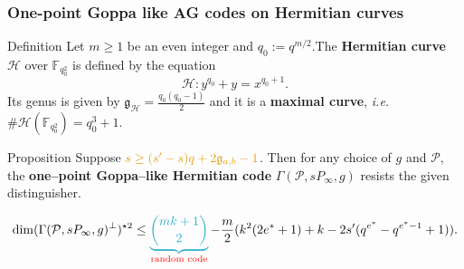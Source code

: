 \documentclass[
10pt, %
%
aspectratio=169, %
]{beamer}
\theoremstyle{plain}%
\theoremstyle{definition}
\theoremstyle{remark}
\newcommand{\calP}{\mathcal{P}}
\newcommand{\calH}{\mathcal{H}}
\newcommand{\fqo}{\mathbb{F}_{q_0^2}}
\begin{document}
\begin{frame}
	\frametitle{One-point Goppa like AG codes on Hermitian curves}
	\begin{block}{Definition }
		Let $m \geq 1$ be an even integer and $q_0 := q^{m/2}$.The \textbf{Hermitian curve} $\calH$ over $\fqo$ is defined by the equation
		\[\calH : y^{q_0}+y = x^{q_0+1}.\]
		Its genus is given by $\mathfrak{g}_{\calH} = \frac{q_0(q_0-1)}{2}$ and it is a \textbf{maximal curve}, \emph{i.e.} $\#\calH(\fqo) = q_0^3+1$.
	\end{block}
	
	\begin{block}{Proposition \cite{lhotel2023goppa}} 
		Suppose $\mathcolor{gamboge}{s \geq (s'-s)q+2\mathfrak{g}_{a,b}-1}$. Then for any choice of $g$ and $\calP$, the \textbf{one--point Goppa--like Hermitian code} $\Gamma(\calP,sP_\infty,g)$ resists the given distinguisher.
	\end{block}
\begin{tcolorbox}[colback=aliceblue]
	$$\dim (\Gamma(\calP,sP_\infty,g)^{\perp})^{\star 2}\leq \mathcolor{ballblue}{\underbrace{\binom{mk+1}{2}}}_{\text{\textcolor{red}{random code}}} - \dfrac{m}{2}(k^2(2e^*+1)+k-2s'(q^{e^*}-q^{e^*-1}+1)). $$
\end{tcolorbox}
\end{frame}
%		
%		
%		
%		
	
\end{document}
